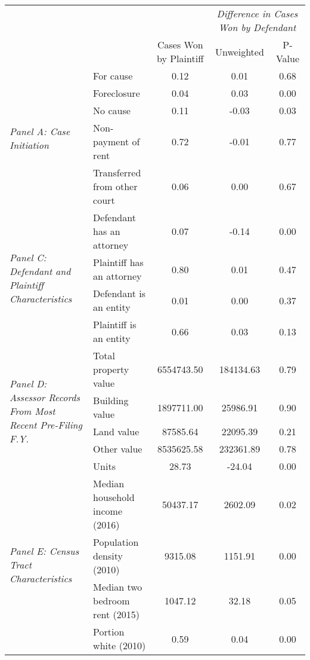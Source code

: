 \begin{tabular}{llccc}
\toprule
 &  & \textit{} & \multicolumn{2}{|c|}{\textit{Difference in Cases Won by Defendant}} \\
 &  & Cases Won by Plaintiff & Unweighted & P-Value \\
\midrule
\multirow[c]{5}{4cm}{\textit{Panel A: Case Initiation}} & For cause & 0.12 & 0.01 & 0.68 \\
 & Foreclosure & 0.04 & 0.03 & 0.00 \\
 & No cause & 0.11 & -0.03 & 0.03 \\
 & Non-payment of rent & 0.72 & -0.01 & 0.77 \\
 & Transferred from other court & 0.06 & 0.00 & 0.67 \\
\cline{1-5}
\multirow[c]{4}{4cm}{\textit{Panel C: Defendant and Plaintiff Characteristics}} & Defendant has an attorney & 0.07 & -0.14 & 0.00 \\
 & Plaintiff has an attorney & 0.80 & 0.01 & 0.47 \\
 & Defendant is an entity & 0.01 & 0.00 & 0.37 \\
 & Plaintiff is an entity & 0.66 & 0.03 & 0.13 \\
\cline{1-5}
\multirow[c]{5}{4cm}{\textit{Panel D: Assessor Records From Most Recent Pre-Filing F.Y.}} & Total property value & 6554743.50 & 184134.63 & 0.79 \\
 & Building value & 1897711.00 & 25986.91 & 0.90 \\
 & Land value & 87585.64 & 22095.39 & 0.21 \\
 & Other value & 8535625.58 & 232361.89 & 0.78 \\
 & Units & 28.73 & -24.04 & 0.00 \\
\cline{1-5}
\multirow[c]{4}{4cm}{\textit{Panel E: Census Tract Characteristics}} & Median household income (2016) & 50437.17 & 2602.09 & 0.02 \\
 & Population density (2010) & 9315.08 & 1151.91 & 0.00 \\
 & Median two bedroom rent (2015) & 1047.12 & 32.18 & 0.05 \\
 & Portion white (2010) & 0.59 & 0.04 & 0.00 \\
\cline{1-5}
\bottomrule
\end{tabular}
